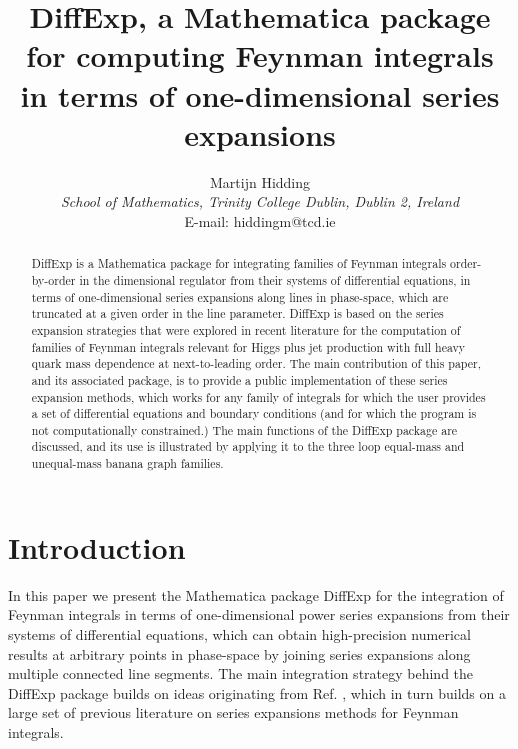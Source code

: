 \documentclass{article}
\title{DiffExp, a Mathematica package for computing Feynman integrals in terms of one-dimensional series expansions
}
\author{Martijn Hidding \\
{\it School of Mathematics, Trinity College Dublin, Dublin 2, Ireland}\\

\vspace*{3.8mm} {E-mail:
hiddingm@tcd.ie
}
}
\date{}
\begin{document}
\maketitle

\begin{abstract}
DiffExp is a Mathematica package for integrating families of Feynman integrals order-by-order in the dimensional regulator from their systems of differential equations, in terms of one-dimensional series expansions along lines in phase-space, which are truncated at a given order in the line parameter. DiffExp is based on the series expansion strategies that were explored in recent literature for the computation of families of Feynman integrals relevant for Higgs plus jet production with full heavy quark mass dependence at next-to-leading order. The main contribution of this paper, and its associated package, is to provide a public implementation of these series expansion methods, which works for any family of integrals for which the user provides a set of differential equations and boundary conditions (and for which the program is not computationally constrained.) The main functions of the DiffExp package are discussed, and its use is illustrated by applying it to the three loop equal-mass and unequal-mass banana graph families.
\end{abstract}

\tableofcontents

\section{Introduction}

In this paper we present the Mathematica package DiffExp for the integration of Feynman integrals in terms of one-dimensional power series expansions from their systems of differential equations, which can obtain high-precision numerical results at arbitrary points in phase-space by joining series expansions along multiple connected line segments. The main integration strategy behind the DiffExp package builds on ideas originating from Ref. \cite{Francesco:2019yqt}, which in turn builds on a large set of previous literature on series expansions methods for Feynman integrals.
\end{document}
